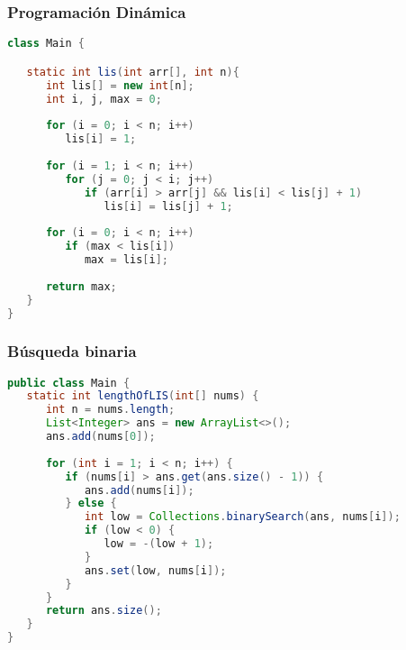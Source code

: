 \subsubsection{Programación Dinámica}
\begin{lstlisting}[language=Java]
class Main {

   static int lis(int arr[], int n){
      int lis[] = new int[n];
      int i, j, max = 0;
		
      for (i = 0; i < n; i++)
         lis[i] = 1;
		
      for (i = 1; i < n; i++)
         for (j = 0; j < i; j++)
            if (arr[i] > arr[j] && lis[i] < lis[j] + 1)
               lis[i] = lis[j] + 1;
		
      for (i = 0; i < n; i++)
         if (max < lis[i])
            max = lis[i];
		
      return max;
   }
}

\end{lstlisting}

\subsubsection{Búsqueda binaria}
\begin{lstlisting}[language=Java]
public class Main {
   static int lengthOfLIS(int[] nums) {
      int n = nums.length;
      List<Integer> ans = new ArrayList<>();
      ans.add(nums[0]);
      
      for (int i = 1; i < n; i++) {
         if (nums[i] > ans.get(ans.size() - 1)) {
            ans.add(nums[i]);
         } else {
		    int low = Collections.binarySearch(ans, nums[i]);
            if (low < 0) {
               low = -(low + 1);
            }
            ans.set(low, nums[i]);
         }
      }
      return ans.size();
   }
}

\end{lstlisting}	